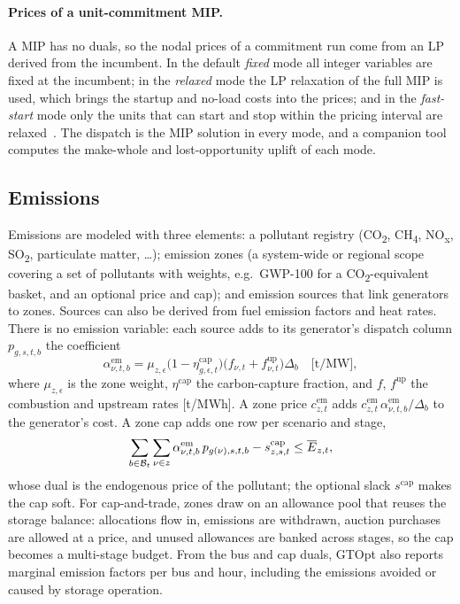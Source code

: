 \paragraph{Prices of a unit-commitment MIP.}
A MIP has no duals, so the nodal prices of a commitment run come from
an LP derived from the incumbent.  In the default \emph{fixed} mode all
integer variables are fixed at the incumbent; in the \emph{relaxed}
mode the LP relaxation of the full MIP is used, which brings the
startup and no-load costs into the prices; and in the \emph{fast-start}
mode only the units that can start and stop within the pricing interval
are relaxed~\cite{oneill2005pricing, hua2017convexhull}.  The dispatch
is the MIP solution in every mode, and a companion tool computes the
make-whole and lost-opportunity uplift of each mode.

\subsection{Emissions}
\label{sec:emission}

Emissions are modeled with three elements: a pollutant registry
(CO\textsubscript{2}, CH\textsubscript{4}, NO\textsubscript{x},
SO\textsubscript{2}, particulate matter, \dots); emission zones (a
system-wide or regional scope covering a set of pollutants with weights,
e.g.\ GWP-100 for a CO\textsubscript{2}-equivalent basket, and an
optional price and cap); and emission sources that link generators to
zones.  Sources can also be derived from fuel emission factors and heat
rates.  There is no emission variable: each source adds to its
generator's dispatch column $p_{g,s,t,b}$ the coefficient
\begin{equation}
\label{eq:emission_coef}
\alpha^{\text{em}}_{\nu,t,b} = \mu_{z,\epsilon}
  \bigl(1-\eta^{\text{cap}}_{g,\epsilon,t}\bigr)
  \bigl(f_{\nu,t} + f^{\text{up}}_{\nu,t}\bigr) \Delta_b
  \quad \text{[t/MW]},
\end{equation}
where $\mu_{z,\epsilon}$ is the zone weight, $\eta^{\text{cap}}$ the
carbon-capture fraction, and $f$, $f^{\text{up}}$ the combustion and
upstream rates [t/MWh].  A zone price $c^{\text{em}}_{z,t}$ adds
$c^{\text{em}}_{z,t}\,\alpha^{\text{em}}_{\nu,t,b}/\Delta_b$ to the
generator's cost.  A zone cap adds one row per scenario and stage,
\begin{equation}
\label{eq:emission_cap}
\sum_{b \in \mathcal{B}_t} \sum_{\nu \in z}
  \alpha^{\text{em}}_{\nu,t,b}\, p_{g(\nu),s,t,b}
  - s^{\text{cap}}_{z,s,t} \leq \overline{E}_{z,t},
\end{equation}
whose dual is the endogenous price of the pollutant; the optional slack
$s^{\text{cap}}$ makes the cap soft.  For cap-and-trade, zones draw on
an allowance pool that reuses the storage balance: allocations flow in,
emissions are withdrawn, auction purchases are allowed at a price, and
unused allowances are banked across stages, so the cap becomes a
multi-stage budget.  From the bus and cap duals, GTOpt also reports
marginal emission factors per bus and hour, including the emissions
avoided or caused by storage operation.

